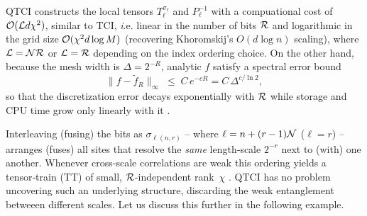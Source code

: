 QTCI constructs the local tensors \(T^{\sigma_\ell}_\ell\) and \(P^{-1}_\ell\) with a compuational cost of \(\mathcal{O}(\mathcal{L} d\chi^{2})\), similar to TCI, {\emph i.e.} linear in the number of bits $\mathcal{R}$ and logarithmic in the grid size $\mathcal{O}( \chi^2 d \log M)$ (recovering Khoromskij’s \(O(d\log n)\) scaling), where $\mathcal{L} = \mathcal{N} \mathcal{R}$ or $\mathcal{L} = \mathcal{R}$ depending on the index ordering choice. On the other hand, because the mesh width is \(\Delta=2^{-R}\), analytic \(f\) satisfy a spectral
error bound
\begin{equation}
	\|f-\tilde f_R\|_\infty\;\le\;C\,e^{-cR}=C\,\Delta^{c/\ln 2},
\end{equation}
so that the discretization error decays exponentially with $\mathcal{R}$ while storage and CPU time grow only linearly with it \cite{Khoromskij2011}.

Interleaving (fusing) the bits as \(\sigma_{\ell(n,r)}\) -- where $\ell = n + (r-1)\mathcal{N}$ ($\ell = r$) -- arranges (fuses) all sites that resolve the \emph{same} length‑scale \(2^{-r}\) next to (with) one another. Whenever cross‑scale correlations are weak this ordering yields a tensor‑train (TT) of small, \(\mathcal{R}\)-independent rank \(\chi\) \cite{Hiroshi2023, Khoromskij2011}. QTCI has no problem uncovering such an underlying structure, discarding the weak entanglement betweeen different scales. Let us discuss this further in the following example. 

